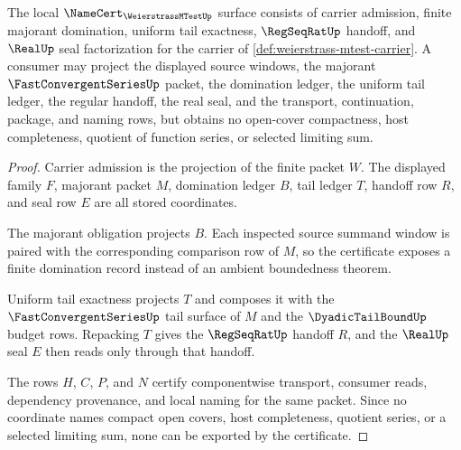 \begin{theorem}
\label{thm:weierstrass-mtest-namecert-obligations}
The local $\NameCert_{\WeierstrassMTestUp}$ surface consists of carrier admission, finite majorant domination, uniform tail exactness, $\RegSeqRatUp$ handoff, and $\RealUp$ seal factorization for the carrier of \autoref{def:weierstrass-mtest-carrier}. A consumer may project the displayed source windows, the majorant $\FastConvergentSeriesUp$ packet, the domination ledger, the uniform tail ledger, the regular handoff, the real seal, and the transport, continuation, package, and naming rows, but obtains no open-cover compactness, host completeness, quotient of function series, or selected limiting sum.
\end{theorem}
\begin{proof}
Carrier admission is the projection of the finite packet $W$. The displayed family $F$, majorant packet $M$, domination ledger $B$, tail ledger $T$, handoff row $R$, and seal row $E$ are all stored coordinates.

The majorant obligation projects $B$. Each inspected source summand window is paired with the corresponding comparison row of $M$, so the certificate exposes a finite domination record instead of an ambient boundedness theorem.

Uniform tail exactness projects $T$ and composes it with the $\FastConvergentSeriesUp$ tail surface of $M$ and the $\DyadicTailBoundUp$ budget rows. Repacking $T$ gives the $\RegSeqRatUp$ handoff $R$, and the $\RealUp$ seal $E$ then reads only through that handoff.

The rows $H$, $C$, $P$, and $N$ certify componentwise transport, consumer reads, dependency provenance, and local naming for the same packet. Since no coordinate names compact open covers, host completeness, quotient series, or a selected limiting sum, none can be exported by the certificate.
\end{proof}

